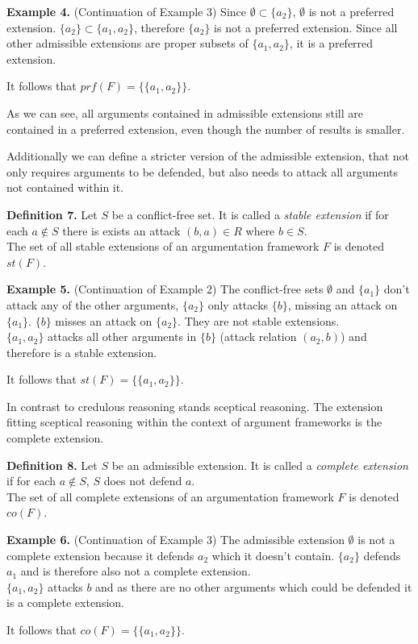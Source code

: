 \documentclass[draft,final]{vutinfth} %
\newcommand{\hl}{\par\vspace{6pt}} %
\newcommand{\cl}{\par\vspace{12pt}} %
\newcommand{\dl}{\par\vspace{24pt}} %
\begin{document}
\textbf{Example 4.} (Continuation of Example 3) Since $\emptyset\subset\{a_2\}$, \(\emptyset\) is not a preferred extension. $\{a_2\}\subset\{a_1,a_2\}$, therefore $\{a_2\}$ is not a preferred extension. Since all other admissible extensions are proper subsets of $\{a_1,a_2\}$, it is a preferred extension.\hl
It follows that $prf(F)=\{\{a_1,a_2\}\}$.\hl
As we can see, all arguments contained in admissible extensions still are contained in a preferred extension, even though the number of results is smaller.\dl

Additionally we can define a stricter version of the admissible extension, that not only requires arguments to be defended, but also needs to attack all arguments not contained within it.\cl

\textbf{Definition 7.} Let $S$ be a conflict-free set. It is called a \emph{stable extension} if for each $a\not\in S$ there is exists an attack $(b,a)\in R$ where $b\in S$.\\
The set of all stable extensions of an argumentation framework $F$ is denoted $st(F)$.\cl

\textbf{Example 5.} (Continuation of Example 2) The conflict-free sets $\emptyset$ and $\{a_1\}$ don't attack any of the other arguments, $\{a_2\}$ only attacks $\{b\}$, missing an attack on $\{a_1\}$. $\{b\}$ misses an attack on $\{a_2\}$. They are not stable extensions.\\
$\{a_1,a_2\}$ attacks all other arguments in $\{b\}$ (attack relation $(a_2,b)$) and therefore is a stable extension.\hl
It follows that $st(F)=\{\{a_1,a_2\}\}$.\dl

In contrast to credulous reasoning stands sceptical reasoning. The extension fitting sceptical reasoning within the context of argument frameworks is the complete extension.\cl

\textbf{Definition 8.} Let $S$ be an admissible extension. It is called a \emph{complete extension} if for each $a\not\in S$, $S$ does not defend $a$.\\
The set of all complete extensions of an argumentation framework $F$ is denoted $co(F)$.\cl

\textbf{Example 6.} (Continuation of Example 3) The admissible extension $\emptyset$ is not a complete extension because it defends $a_2$ which it doesn't contain. $\{a_2\}$ defends $a_1$ and is therefore also not a complete extension.\\
$\{a_1,a_2\}$ attacks $b$ and as there are no other arguments which could be defended it is a complete extension.\hl
It follows that $co(F)=\{\{a_1,a_2\}\}$.\dl
\end{document}
